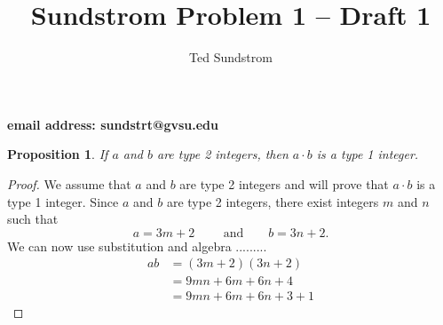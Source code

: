 \documentclass[12pt]{article}
\title{Sundstrom Problem 1 -- Draft 1}
\author{Ted Sundstrom}
\theoremstyle{plain}
\newtheorem{proposition}[theorem]{Proposition}
\begin{document}
\maketitle

\begin{center}
\textbf{email address: sundstrt@gvsu.edu}
\end{center}

\begin{proposition}
If $a$ and $b$ are type 2 integers, then $a \cdot b$ is a type 1 integer.
\end{proposition}

\begin{proof}
We assume that $a$ and $b$ are type 2 integers and will prove that $a \cdot b$ is a type 1 integer.  Since $a$ and $b$ are type 2 integers, there exist integers $m$ and $n$ such that
\[
a = 3m + 2 \text{ ~~~~~~and~~~~~ } b = 3n + 2.
\]
We can now  use substitution and algebra .........
\begin{align*}
ab &= (3m + 2)(3n + 2) \\
    &= 9mn + 6m + 6n + 4 \\
    &= 9mn + 6m + 6n + 3 + 1
\end{align*}
\end{proof}
\end{document}
